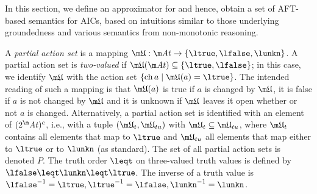 In this section, we define an approximator for \Op and hence, obtain a set of AFT-based semantics for AICs, based on intuitions similar to those underlying groundedness and various semantics from non-monotonic reasoning. 



% 


A \emph{partial action set} is a mapping $\UUU:\atoms \to \{\ltrue,\lfalse,\lunkn\}$. A partial action set \UUU is \emph{two-valued} if $\UUU(\atoms)\subseteq\{\ltrue,\lfalse\}$; in this case, we identify $\UUU$ with the action set $\{\change a\mid \UUU(a)=\ltrue\}$. 
The intended reading of such a mapping is that $\UUU(a)$ is true if $a$ is changed by $\UUU$, it is false if $a$ is not changed by $\UUU$ and it is unknown if $\UUU$ leaves it open whether or not $a$ is changed. 
Alternatively, a partial action set is identified with an element of $(2^\atoms)^c$, i.e., with a tuple $(\UUU_t,\UUU_{tu})$ with $\UUU_t\subseteq\UUU_{tu}$, where $\UUU_t$ contains all elements that map to $\ltrue$ and $\UUU_{tu}$ all elements that map either to $\ltrue$ or to $\lunkn$ (as standard). 
The set of all partial action sets is denoted $P$.
The truth order $\leqt$ on three-valued truth values is defined by $\lfalse\leqt\lunkn\leqt\ltrue$. The inverse of a truth value is $\lfalse^{-1}=\ltrue, \ltrue^{-1}=\lfalse, \lunkn^{-1}=\lunkn$.

